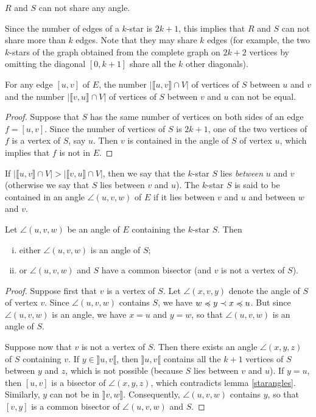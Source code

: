 \documentclass[12pt]{amsart}
\begin{document}
\begin{corollary}
$R$ and $S$ can not share any angle.
\end{corollary}

Since the number of edges of a $k$-star is $2k+1$, this implies that $R$ and $S$ can not share more than $k$ edges. Note that they may share $k$ edges (for example, the two $k$-stars of the graph obtained from the complete graph on $2k+2$ vertices by omitting the diagonal $[0,k+1]$ share all the $k$  other diagonals).

\begin{corollary}
For any edge $[u,v]$ of $E$, the number $|\llbracket u,v\rrbracket\cap V|$ of vertices of $S$ between $u$ and $v$ and the number $|\llbracket v,u\rrbracket\cap V|$ of vertices of $S$ between $v$ and $u$ can not be equal.
\end{corollary}

\begin{proof}
Suppose that $S$ has the same number of vertices on both sides of an edge $f=[u,v]$. Since the number of vertices of $S$ is $2k+1$, one of the two vertices of $f$ is a vertex of $S$, say $u$. Then $v$ is contained in the angle of $S$ of vertex $u$, which implies that $f$ is not in $E$.
\end{proof}

If $|\llbracket u,v\rrbracket\cap V|>|\llbracket v,u\rrbracket\cap V|$, then we say that the $k$-star $S$ lies \emph{between} $u$ and $v$ (otherwise we say that $S$ lies between $v$ and $u$). 
The $k$-star $S$ is said to be contained in an angle $\angle(u,v,w)$ of $E$ if it lies between $v$ and $u$ and between $w$ and $v$.

\begin{lemma}
Let $\angle(u,v,w)$ be an angle of $E$ containing the $k$-star $S$. Then
\begin{enumerate}[(i)]
\item either $\angle(u,v,w)$ is an angle of $S$;
\item or $\angle(u,v,w)$ and $S$ have a common bisector (and $v$ is not a vertex of $S$).
\end{enumerate}
\end{lemma}

\begin{proof}
Suppose first that $v$ is a vertex of $S$. Let $\angle(x,v,y)$ denote the angle of $S$ of vertex $v$. Since $\angle(u,v,w)$ contains $S$, we have $w\preccurlyeq y\prec x\preccurlyeq u$. But since $\angle(u,v,w)$ is an angle, we have $x=u$ and $y=w$, so that $\angle(u,v,w)$ is an angle of $S$.

Suppose now that $v$ is not a vertex of $S$. Then there exists an angle $\angle(x,y,z)$ of $S$ containing $v$. If $y\in\rrbracket u,v\llbracket$, then $\rrbracket u,v\llbracket$ contains all the $k+1$ vertices of $S$ between $y$ and $z$, which is not possible (because $S$ lies between $v$ and $u$). If $y=u$, then $[u,v]$ is a bisector of $\angle(x,y,z)$, which contradicts lemma \ref{starangles}. Similarly, $y$ can not be in $\rrbracket v,w\rrbracket$. Consequently, $\angle(u,v,w)$ contains $y$, so that $[v,y]$ is a common bisector of $\angle(u,v,w)$ and $S$.
\end{proof}
\end{document}
